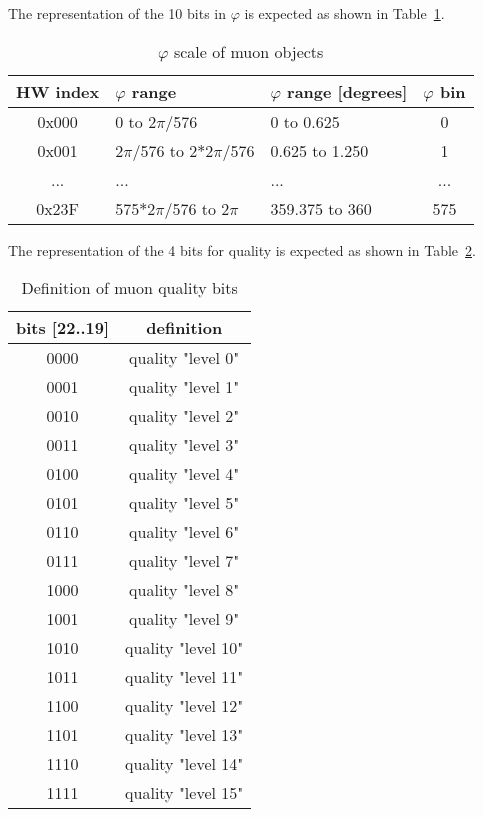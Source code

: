 The representation of the 10 bits in $\varphi$ is expected as shown in Table~\ref{tab:gtl:muon_phi_scale}.\\

\begin{table}[htdp]
\begin{center}
\begin{tabular}{|c|l|l|c|}\hline
HW index & $\varphi$ range & $\varphi$ range [degrees] & $\varphi$ bin\\\hline\hline
0x000 & 0 to 2$\pi$/576 & 0 to 0.625 & 0\\\hline
0x001 & 2$\pi$/576 to 2$*$2$\pi$/576 & 0.625 to 1.250 & 1\\\hline
... & ... & ... & ...\\\hline
0x23F & 575$*$2$\pi$/576 to 2$\pi$ & 359.375 to 360 & 575\\\hline
\end{tabular}
\end{center}
\caption{$\varphi$ scale of muon objects}
\label{tab:gtl:muon_phi_scale}
\end{table}

The representation of the 4 bits for quality is expected as shown in Table~\ref{tab:gtl:muon_quality_bits}.\\

\begin{table}[ht]
\caption{Definition of muon quality bits}
\vspace{5mm}
\centering
\begin{tabular}{|c|c|}\hline
bits [22..19] & definition \\\hline\hline
0000 & quality "level 0" \\
0001 & quality "level 1" \\
0010 & quality "level 2" \\
0011 & quality "level 3" \\
0100 & quality "level 4" \\
0101 & quality "level 5" \\
0110 & quality "level 6" \\
0111 & quality "level 7" \\
1000 & quality "level 8" \\
1001 & quality "level 9" \\
1010 & quality "level 10" \\
1011 & quality "level 11" \\
1100 & quality "level 12" \\
1101 & quality "level 13" \\
1110 & quality "level 14" \\
1111 & quality "level 15" \\\hline
\end{tabular}
\label{tab:gtl:muon_quality_bits}
\end{table}


